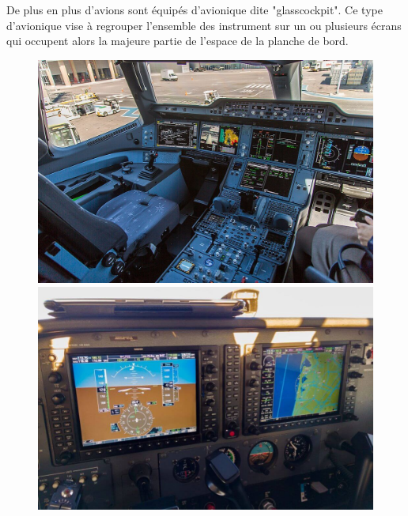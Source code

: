 	De plus en plus d'avions sont équipés d'avionique dite "\gls{glasscockpit}". Ce type d'avionique vise à regrouper l'ensemble des instrument sur un ou plusieurs écrans qui occupent alors la majeure partie de l'espace de la planche de bord.
	
	\begin{figure}[H]
	\begin{minipage}[c]{0.5\linewidth}
	\includegraphics[width=\linewidth]{01-EtudeAeronefs/img/A350Cockpit.jpg}
	\end{minipage}
	\hfill
	\begin{minipage}[c]{0.5\linewidth}
	\includegraphics[width=\linewidth]{01-EtudeAeronefs/img/C172glassCockpit.jpg}
	\end{minipage}
	\end{figure}
	
